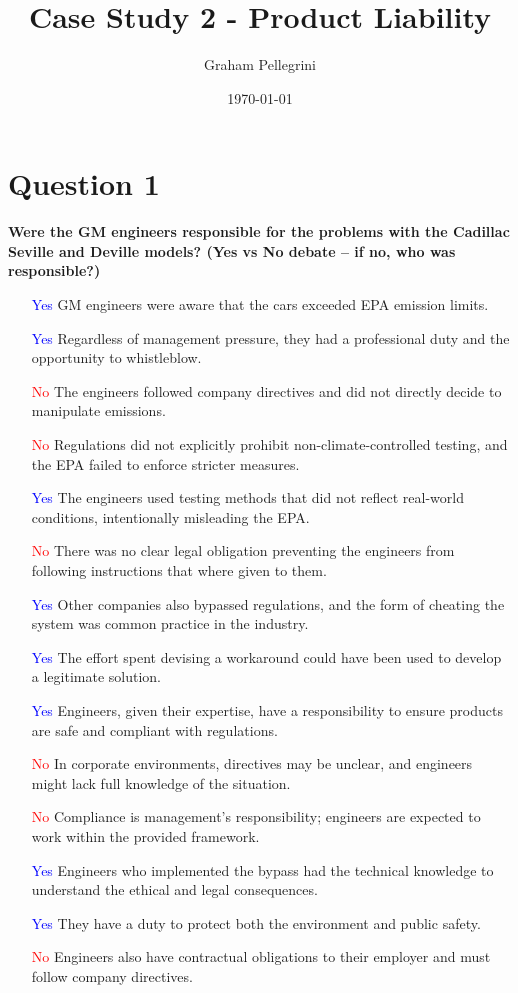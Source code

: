 \documentclass[12pt]{article}
\title{Case Study 2 - Product Liability}
\author{Graham Pellegrini }
\date{\today}
\begin{document}
\maketitle

\section{Question 1}
\textbf{Were the GM engineers responsible for the problems with the Cadillac Seville and Deville models? (Yes vs No debate – if no, who was responsible?)}

\begin{itemize}
    \item [\textcolor{blue}{Yes}] GM engineers were aware that the cars exceeded EPA emission limits.
    \item [\textcolor{blue}{Yes}] Regardless of management pressure, they had a professional duty and the opportunity to whistleblow.
    \item [\textcolor{red}{No}] The engineers followed company directives and did not directly decide to manipulate emissions.
    \item [\textcolor{red}{No}] Regulations did not explicitly prohibit non-climate-controlled testing, and the EPA failed to enforce stricter measures.
    \item [\textcolor{blue}{Yes}] The engineers used testing methods that did not reflect real-world conditions, intentionally misleading the EPA.
    \item [\textcolor{red}{No}] There was no clear legal obligation preventing the engineers from following instructions that where given to them.
    \item [\textcolor{blue}{Yes}] Other companies also bypassed regulations, and the form of cheating the system was common practice in the industry.
    \item [\textcolor{blue}{Yes}] The effort spent devising a workaround could have been used to develop a legitimate solution.
    \item [\textcolor{blue}{Yes}] Engineers, given their expertise, have a responsibility to ensure products are safe and compliant with regulations.
    \item [\textcolor{red}{No}] In corporate environments, directives may be unclear, and engineers might lack full knowledge of the situation.
    \item [\textcolor{red}{No}] Compliance is management's responsibility; engineers are expected to work within the provided framework.
    \item [\textcolor{blue}{Yes}] Engineers who implemented the bypass had the technical knowledge to understand the ethical and legal consequences.
    \item [\textcolor{blue}{Yes}] They have a duty to protect both the environment and public safety.
    \item [\textcolor{red}{No}] Engineers also have contractual obligations to their employer and must follow company directives.
\end{itemize}
\end{document}
